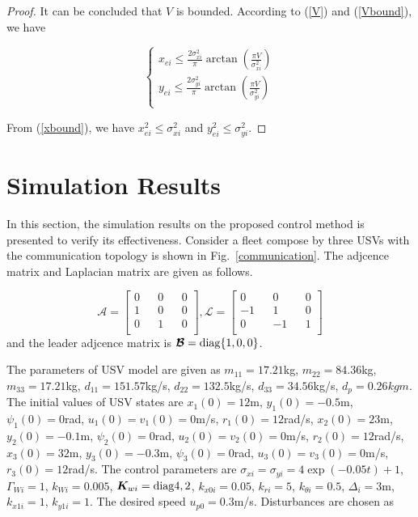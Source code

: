 \documentclass[english]{cccconf}
\begin{document}
\begin{proof}
It can be concluded that $V$ is bounded. According to (\ref{V}) and (\ref{Vbound}), we have

\begin{equation}\label{xbound}
	\left\{
	\begin{aligned}
		x_{ei}\leq \frac{2\sigma^2_{xi}}{\pi}\arctan(\frac{\pi V}{\sigma^2_{xi}})\\
		y_{ei}\leq \frac{2\sigma^2_{yi}}{\pi}\arctan(\frac{\pi V}{\sigma^2_{yi}})\\
	\end{aligned}
	\right.
\end{equation}

From (\ref{xbound}), we have $x^2_{ei}\leq \sigma^2_{xi}$ and $y^2_{ei}\leq \sigma^2_{yi}$. \end{proof}

\section{Simulation Results}

In this section, the simulation results on the proposed control method is presented to verify its effectiveness. Consider a fleet compose by three USVs with the communication topology is shown in Fig.~\ref{communication}. The adjcence matrix and Laplacian matrix are given as follows.

\begin{equation}
	\bm{\mathcal{A}}=\begin{bmatrix}
		0 && 0 && 0\\
		1 && 0 && 0\\
		0 && 1 && 0\\
	\end{bmatrix},
	\bm{\mathcal{L}}=\begin{bmatrix}
		0 && 0 && 0\\
		-1 && 1 && 0\\
		0 && -1 && 1\\
	\end{bmatrix}
\end{equation}
and the leader adjcence matrix is $\bm{\mathcal{B}}={\rm diag\{1,0,0\}}$. 

The parameters of USV model are given as $m_{11}=17.21$kg, $m_{22}=84.36$kg, $m_{33}=17.21$kg, $d_{11}=151.57$kg/s, $d_{22}=132.5$kg/s, $d_{33}=34.56$kg/s, $d_p=0.26kgm$. The initial values of USV states are $x_1(0)=12$m, $y_1(0)=-0.5$m, $\psi_1(0)=0$rad, $u_1(0)=v_1(0)=0$m/s, $r_1(0)=12$rad/s, $x_2(0)=23$m, $y_2(0)=-0.1$m, $\psi_2(0)=0$rad, $u_2(0)=v_2(0)=0$m/s, $r_2(0)=12$rad/s, $x_3(0)=32$m, $y_3(0)=-0.3$m, $\psi_3(0)=0$rad, $u_3(0)=v_3(0)=0$m/s, $r_3(0)=12$rad/s. The control parameters are $\sigma_{xi}=\sigma_{yi}=4\exp(-0.05t)+1$, $\Gamma_{Wi}=1$, $k_{Wi}=0.005$, $\bm{K}_{wi}={\rm diag}{4,2}$, $k_{x0i}=0.05$, $k_{ri}=5$, $k_{\theta i}=0.5$, $\Delta_i=3$m, $k_{x1i}=1$, $k_{y1i}=1$. The desired speed $u_{p0}=0.3$m/s. Disturbances are chosen as
\end{document}
